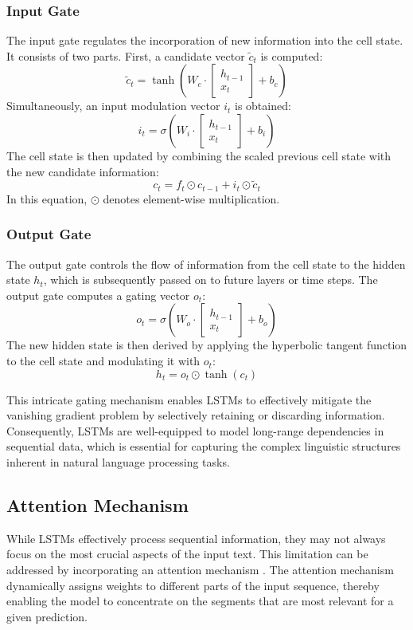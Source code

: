 \documentclass[sn-mathphys-ay, Numbered]{sn-jnl}
\theoremstyle{thmstyleone}%
\theoremstyle{thmstyletwo}%
\theoremstyle{thmstylethree}%
\begin{document}
\subsubsection{Input Gate}
The input gate regulates the incorporation of new information into the cell state. It consists of two parts. First, a candidate vector \( \tilde{c}_t \) is computed:
\[
\tilde{c}_t = \tanh\!\left(W_c \cdot \begin{bmatrix} h_{t-1} \\ x_t \end{bmatrix} + b_c\right)
\]
Simultaneously, an input modulation vector \( i_t \) is obtained:
\[
i_t = \sigma\!\left(W_i \cdot \begin{bmatrix} h_{t-1} \\ x_t \end{bmatrix} + b_i\right)
\]
The cell state is then updated by combining the scaled previous cell state with the new candidate information:
\[
c_t = f_t \odot c_{t-1} + i_t \odot \tilde{c}_t
\]
In this equation, \( \odot \) denotes element-wise multiplication.

\subsubsection{Output Gate}
The output gate controls the flow of information from the cell state to the hidden state \( h_t \), which is subsequently passed on to future layers or time steps. The output gate computes a gating vector \( o_t \):
\[
o_t = \sigma\!\left(W_o \cdot \begin{bmatrix} h_{t-1} \\ x_t \end{bmatrix} + b_o\right)
\]
The new hidden state is then derived by applying the hyperbolic tangent function to the cell state and modulating it with \( o_t \):
\[
h_t = o_t \odot \tanh(c_t)
\]

This intricate gating mechanism enables LSTMs to effectively mitigate the vanishing gradient problem by selectively retaining or discarding information. Consequently, LSTMs are well-equipped to model long-range dependencies in sequential data, which is essential for capturing the complex linguistic structures inherent in natural language processing tasks.


\subsection{Attention Mechanism}

While LSTMs effectively process sequential information, they may not always focus on the most crucial aspects of the input text. This limitation can be addressed by incorporating an attention mechanism \citep{Attention}. The attention mechanism dynamically assigns weights to different parts of the input sequence, thereby enabling the model to concentrate on the segments that are most relevant for a given prediction.
\end{document}
